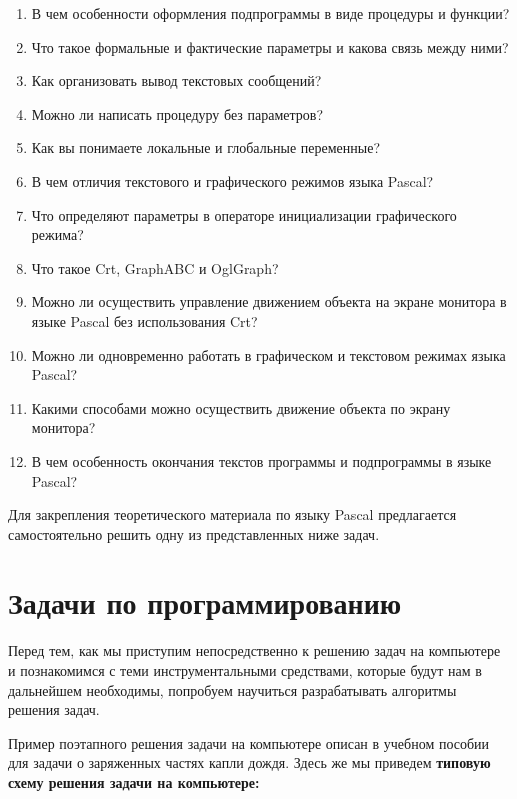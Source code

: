 \begin{enumerate}
\item В чем особенности оформления подпрограммы в виде про­цедуры и функции?
\item Что такое формальные и фактические параметры и какова связь между ними?
\item Как организовать вывод текстовых сообщений?
\item Можно ли написать процедуру без параметров?
\item Как вы понимаете локальные и глобальные переменные?
\item В чем отличия текстового и графического режимов языка Pascal?
\item Что определяют параметры в операторе инициализации гра­фического режима?
\item Что такое Crt, GraphABC и OglGraph?
\item Можно ли осуществить управление движением объекта на экране монитора в языке Pascal без использования Crt?
\item Можно ли одновременно работать в графическом и текстовом режимах языка Pascal?
\item Какими способами можно осуществить движение объекта по экрану монитора?
\item В чем особенность окончания текстов программы и подпрограммы в языке Pascal?
\end{enumerate}

Для закрепления теоретического материала по языку Pascal предлагается самостоятельно решить одну из представленных ниже задач.

\section{Задачи по программированию}

Перед тем, как мы приступим непосредственно к решению задач на компьютере и познакомимся с теми инструментальными средствами, которые будут нам в дальнейшем необходимы, попро­буем научиться разрабатывать алгоритмы решения задач.

Пример поэтапного решения задачи на компьютере описан в учебном пособии для задачи о заряженных частях капли дождя. Здесь же мы приведем {\bf типовую схему решения задачи на компьютере:}
\vspace{5mm}


